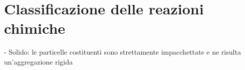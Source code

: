 \section{Classificazione delle reazioni chimiche}
- Solido: le particelle costituenti sono strettamente impacchettate e ne risulta un'aggregazione rigida
